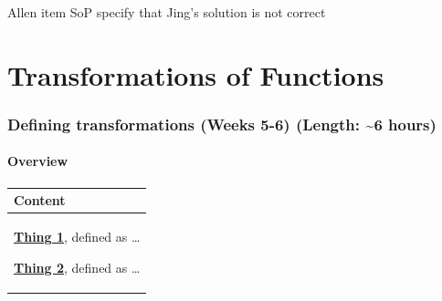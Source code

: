 \documentclass[11pt]{article}
\newcommand\about{\textasciitilde}
\renewcommand\emph[1]{\underline{\bf{#1}}} %
\theoremstyle{definition}
\begin{document}

%


Allen item SoP
specify that Jing's solution is not correct


\newpage 
\part{Transformations of Functions} 

 \section{Defining transformations (Weeks 5-6) (Length: \about 6 hours)}  %
\subsection{Overview}

\begin{tabular}{L{6.5in}} 
{\bf Content} \\ \hline \parskip4pt
\emph{Thing 1}, defined as \dots 

\emph{Thing 2}, defined as \dots 
\end{tabular} 
\end{document}

